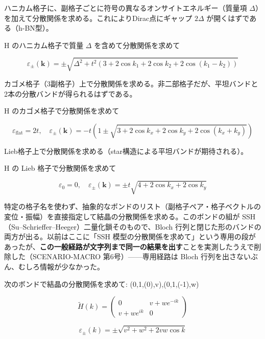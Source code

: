 \documentclass[dvipdfmx,a4paper,11pt]{jsarticle}
\begin{document}
ハニカム格子に、副格子ごとに符号の異なるオンサイトエネルギー（質量項 $\Delta$）を加えて分散関係を求める。これによりDirac点にギャップ $2\Delta$ が開くはずである（h-BN型）。

H のハニカム格子で質量 $\Delta$ を含めて分散関係を求めて

\begin{equation}
  \varepsilon_\pm(\mathbf{k}) = \pm \sqrt{ \Delta^2 + t^2 \left( 3 + 2\cos k_1 + 2\cos k_2 + 2\cos(k_1 - k_2) \right) }
  \label{eq:E6}
\end{equation}

カゴメ格子（3副格子）上で分散関係を求める。非二部格子だが、平坦バンドと2本の分散バンドが得られるはずである。

H のカゴメ格子で分散関係を求めて

\begin{equation}
  \varepsilon_{\mathrm{flat}} = 2t, \quad \varepsilon_\pm(\mathbf{k}) = -t \left( 1 \pm \sqrt{ 3 + 2\cos k_x + 2\cos k_y + 2\cos(k_x + k_y) } \right)
  \label{eq:E7}
\end{equation}

Lieb格子上で分散関係を求める（star構造による平坦バンドが期待される）。

H の Lieb 格子で分散関係を求めて

\begin{equation}
  \varepsilon_0 = 0, \quad \varepsilon_\pm(\mathbf{k}) = \pm t \sqrt{ 4 + 2\cos k_x + 2\cos k_y }
  \label{eq:E8}
\end{equation}

特定の格子名を使わず、抽象的なボンドのリスト（副格子ペア・格子ベクトルの変位・振幅）を直接指定して結晶の分散関係を求める。このボンドの組が SSH（Su–Schrieffer–Heeger）二量化鎖そのもので、Bloch 行列と閉じた形のバンドの両方が出る。以前はここに「SSH 模型の分散関係を求めて」という専用の段があったが、\textbf{この一般経路が文字列まで同一の結果を出す}ことを実測したうえで削除した（SCENARIO-MACRO 第6号）——専用経路は Bloch 行列を出さないぶん、むしろ情報が少なかった。

次のボンドで結晶の分散関係を求めて: (0,1,(0),v),(0,1,(-1),w)

\begin{equation}
  \tilde H(k) = \begin{pmatrix} 0 & v + w e^{-i k} \\ v + w e^{i k} & 0 \end{pmatrix}
  \label{eq:E9}
\end{equation}

\begin{equation}
  \varepsilon_\pm(k) = \pm \sqrt{ v^2 + w^2 + 2 v w \cos k }
  \label{eq:E10}
\end{equation}
\end{document}
